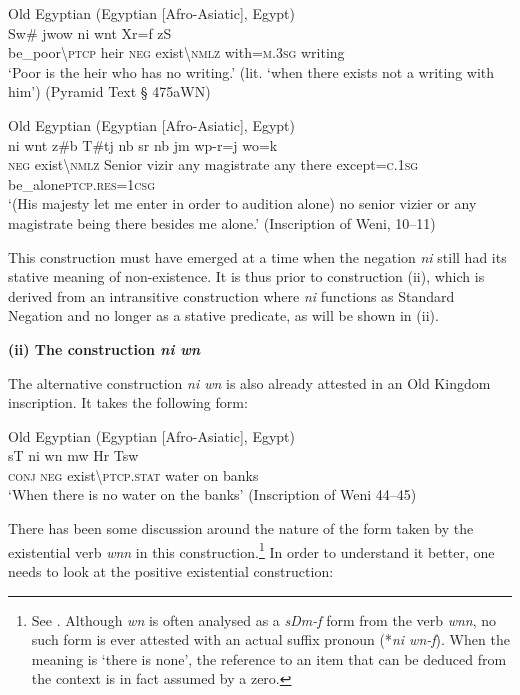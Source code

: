 \documentclass[output=paper]{langsci/langscibook}
\begin{document}
\ea Old Egyptian (Egyptian [Afro-Asiatic], Egypt) \label{ex:AE21}\\
    \gll Sw\# jwow ni wnt Xr=f zS\\ 
    be\_poor\textbackslash\textsc{ptcp} heir \textsc{neg} exist\textbackslash\textsc{nmlz} with=\textsc{m.3sg} writing \\
    
    \glt ‘Poor is the heir who has no writing.’ (lit. ‘when there exists not a writing with him’) (Pyramid Text § 475aWN) 
\z

\ea Old Egyptian (Egyptian [Afro-Asiatic], Egypt) \label{ex:AE22}\\
    \gll ni wnt z\#b T\#tj nb sr nb jm wp-r=j  wo=k \\  
    \textsc{neg} exist\textbackslash\textsc{nmlz} Senior vizir any magistrate any there except=\textsc{c.1sg} be\_alone\textsc{ptcp.res=1csg}\\ 
    \glt ‘(His majesty let me enter in order to audition alone) no senior vizier or any magistrate being there besides me alone.’ (Inscription of Weni, 10–11) 
\z

This construction must have emerged at a time when the negation \textit{ni} still had its stative meaning of non-existence. It is thus prior to construction (ii), which is derived from an intransitive construction where \textit{ni} functions as Standard Negation and no longer as a stative predicate, as will be shown in (ii). 


\medskip
\noindent
\textbf{(ii) The construction \textit{ni wn}} 


The alternative construction \textit{ni wn} is also already attested in an Old Kingdom inscription. It takes the following form: 

\ea Old Egyptian (Egyptian [Afro-Asiatic], Egypt) \label{ex:AE23}\\
    \gll sT ni wn mw Hr Tsw\\ 
    \textsc{conj} \textsc{neg} exist\textbackslash\textsc{ptcp.stat} water on banks\\ 
    \glt ‘When there is no water on the banks’ (Inscription of Weni 44–45) 
\z

There has been some discussion around the nature of the form taken by the existential verb \textit{wnn} in this construction.\footnote{See \citet{Meltzer1990}. Although \textit{wn} is often analysed as a \textit{sDm-f} form from the verb \textit{wnn}, no such form is ever attested with an actual suffix pronoun (*\textit{ni wn-f}).   When the meaning is ‘there is none’, the reference to an item that can be deduced from the context is in fact assumed by a zero. } In order to understand it better, one needs to look at the positive existential construction:
 
\end{document}
